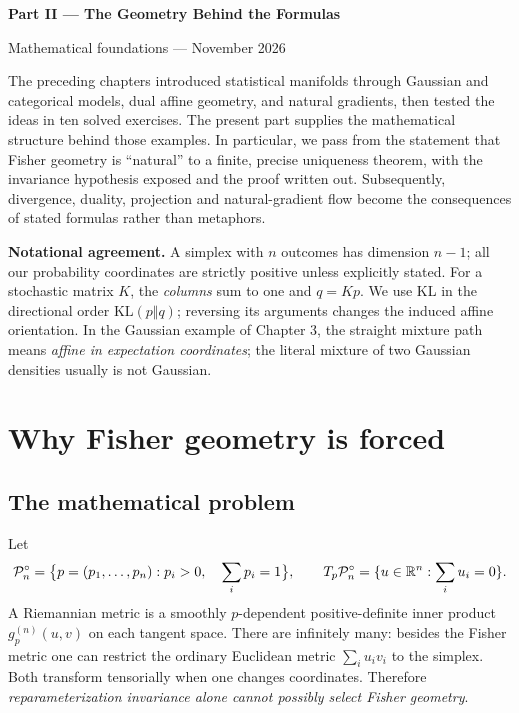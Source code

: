 \documentclass[11pt]{article}
\theoremstyle{definition}\newtheorem{definition}[theorem]{Definition}\newtheorem{exercise}{Problem}[section]
\newcommand{\KL}{\mathrm{KL}}
\begin{document}
\begin{center}
{\Large\bfseries Part II --- The Geometry Behind the Formulas}\par
\vspace{.3em}
{\small Mathematical foundations --- November 2026}\par
\end{center}

The preceding chapters introduced statistical manifolds through Gaussian and categorical models, dual affine geometry, and natural gradients, then tested the ideas in ten solved exercises. The present part supplies the mathematical structure behind those examples. In particular, we pass from the statement that Fisher geometry is ``natural'' to a finite, precise uniqueness theorem, with the invariance hypothesis exposed and the proof written out. Subsequently, divergence, duality, projection and natural-gradient flow become the consequences of stated formulas rather than metaphors.

\textbf{Notational agreement.} A simplex with $n$ outcomes has dimension $n-1$; all our probability coordinates are strictly positive unless explicitly stated. For a stochastic matrix $K$, the \emph{columns} sum to one and $q=Kp$. We use KL in the directional order $\KL(p\Vert q)$; reversing its arguments changes the induced affine orientation. In the Gaussian example of Chapter 3, the straight mixture path means \emph{affine in expectation coordinates}; the literal mixture of two Gaussian densities usually is not Gaussian.

\section{Why Fisher geometry is forced}

\subsection{The mathematical problem}

Let
\[
 \mathcal P_n^\circ=\bigl\{p=(p_1,\ldots,p_n):p_i>0,\quad\sum_i p_i=1\bigr\},
 \qquad T_p\mathcal P_n^\circ=\{u\in\mathbb R^n:\sum_i u_i=0\}.
\]
A Riemannian metric is a smoothly $p$-dependent positive-definite inner product $g^{(n)}_p(u,v)$ on each tangent space. There are infinitely many: besides the Fisher metric one can restrict the ordinary Euclidean metric $\sum_i u_iv_i$ to the simplex. Both transform tensorially when one changes coordinates. Therefore \emph{reparameterization invariance alone cannot possibly select Fisher geometry}.
\end{document}
